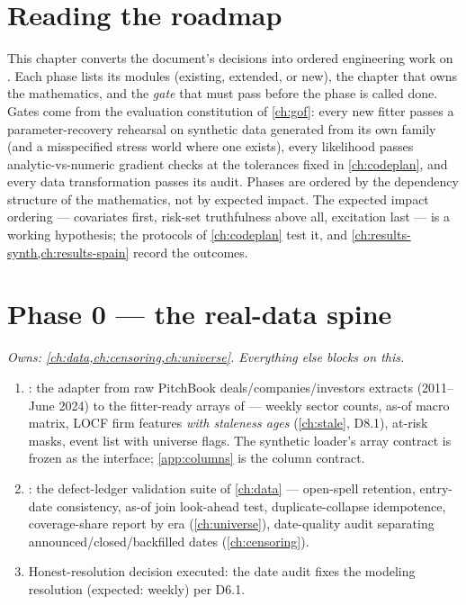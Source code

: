 
\section{Reading the roadmap}\label{ch13:sec:reading}

This chapter converts the document's decisions into ordered engineering
work on \modrepo{}. Each phase lists its modules (existing, extended, or
new), the chapter that owns the mathematics, and the \emph{gate} that
must pass before the phase is called done. Gates come from the
evaluation constitution of \cref{ch:gof}: every new fitter passes a
parameter-recovery rehearsal on synthetic data generated from its own
family (and a misspecified stress world where one exists), every likelihood
passes analytic-vs-numeric gradient checks at the tolerances fixed in
\cref{ch:codeplan}, and every data
transformation passes its audit. Phases are ordered by the dependency
structure of the mathematics, not by expected impact. The expected
impact ordering --- covariates first, risk-set truthfulness above all,
excitation last --- is a working hypothesis; the protocols of
\cref{ch:codeplan} test it, and \cref{ch:results-synth,ch:results-spain}
record the outcomes.

\section{Phase 0 --- the real-data spine}\label{ch13:sec:phase0}

\emph{Owns: \cref{ch:data,ch:censoring,ch:universe}. Everything else
blocks on this.}

\begin{enumerate}[label=P0.\arabic*,leftmargin=3.2em]
\item {}: the adapter from raw PitchBook
deals/companies/investors extracts (2011--June 2024) to the fitter-ready
arrays of  --- weekly sector counts, as-of
macro matrix, LOCF firm features \emph{with staleness ages}
(\cref{ch:stale}, D8.1), at-risk masks, event list with universe flags.
The synthetic loader's array contract is frozen as the interface;
\cref{app:columns} is the column contract.
\item {}: the defect-ledger validation suite of
\cref{ch:data} --- open-spell retention, entry-date consistency, as-of
join look-ahead test, duplicate-collapse idempotence, coverage-share
report by era (\cref{ch:universe}), date-quality audit separating
announced/closed/backfilled dates (\cref{ch:censoring}).
\item Honest-resolution decision executed: the date audit fixes the
modeling resolution (expected: weekly) per D6.1.
\end{enumerate}

